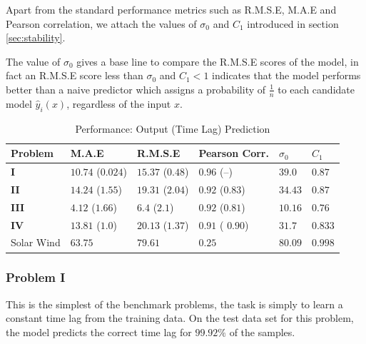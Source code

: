 \documentclass[envcountsect,runningheads]{llncs}
\theoremstyle{etoile}
\begin{document}
Apart from the standard performance metrics such as R.M.S.E, M.A.E and Pearson correlation,
we attach the values of $\sigma_0$ and $C_1$ introduced in section \ref{sec:stability}.

The value of $\sigma_0$ gives a base line to compare the R.M.S.E scores of the model, 
in fact an R.M.S.E score less than $\sigma_0$ and $C_1 < 1$ indicates that the model 
performs better than a naive predictor which assigns a probability of $\frac{1}{n}$ 
to each candidate model $\hat{y}_i(x)$, regardless of the input $x$.

\begin{table}
  \caption{Performance: Output (Time Lag) Prediction}\label{tab:results_syn}
  \centering
  \begin{tabular}{ l l l l l l}
  \hline
  Problem &  M.A.E & R.M.S.E & Pearson Corr. & $\sigma_0$ & $C_1$\\
  \hline
  \textbf{I} & $10.74$ ($0.024$)  & $15.37$ ($0.48$) & $0.96$ (--) & $39.0$ & $0.87$\\
  \textbf{II} & $14.24$ ($1.55$) & $19.31$ ($2.04$) & $0.92$ ($0.83$) & $34.43$ & $0.87$\\
  \textbf{III} & $4.12$ ($1.66$) & $6.4$ ($2.1$) & $0.92$ ($0.81$) & $10.16$ & $0.76$\\
  \textbf{IV} & $13.81$ ($1.0$) & $20.13$ ($1.37$) & $0.91$ ( $0.90$) & $31.7$ & $0.833$\\
  Solar Wind & $63.75$ & $79.61$ & $0.25$ & $80.09$ & $0.998$\\
  \hline
  \end{tabular}
\end{table}

\subsubsection{Problem I}

This is the simplest of the benchmark problems, the task is simply to learn a constant time lag from 
the training data. On the test data set for this problem, the model predicts the correct time lag for 
$99.92\%$ of the samples.
\end{document}
